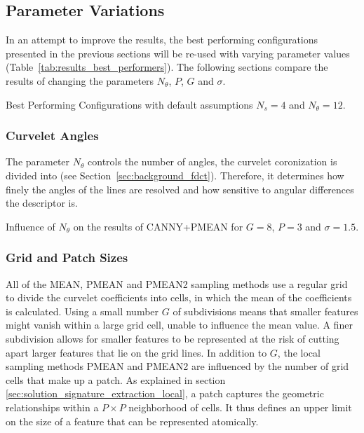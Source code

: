 \subsection{Parameter Variations}

In an attempt to improve the results, the best performing configurations
presented in the previous sections will be re-used with varying parameter
values (Table~\ref{tab:results_best_performers}). The following sections
compare the results of changing the parameters $N_{\theta}$, $P$, $G$ and
$\sigma$.

\begin{table}[h]
    \centering
    \resultsbestperformers
    \caption[Best Performing Configurations]{
        Best Performing Configurations with default assumptions $N_s=4$ and
        $N_{\theta}=12$.
    }
    \label{tab:results_best_performers}
\end{table}

\FloatBarrier
\subsubsection{Curvelet Angles}

The parameter $N_{\theta}$ controls the number of angles, the curvelet
coronization is divided into (see Section~\ref{sec:background_fdct}).
Therefore, it determines how finely the angles of the lines are resolved and
how sensitive to angular differences the descriptor is.

\begin{table}[h]
    \centering
    \resultsparameterangles
    \caption[Angle Parameter Results]{
        Influence of $N_{\theta}$ on the results of CANNY+PMEAN for $G=8$,
        $P=3$ and $\sigma=1.5$.
    }
    \label{tab:results_parameter_angles}
\end{table}

\FloatBarrier
\subsubsection{Grid and Patch Sizes}

All of the MEAN, PMEAN and PMEAN2 sampling methods use a regular grid to divide
the curvelet coefficients into cells, in which the mean of the coefficients is
calculated. Using a small number $G$ of subdivisions means that smaller
features might vanish within a large grid cell, unable to influence the mean
value. A finer subdivision allows for smaller features to be represented at the
risk of cutting apart larger features that lie on the grid lines. In addition
to $G$, the local sampling methods PMEAN and PMEAN2 are influenced by the
number of grid cells that make up a patch. As explained in section
\ref{sec:solution_signature_extraction_local}, a patch captures the geometric
relationships within a $P \times P$ neighborhood of cells. It thus defines an
upper limit on the size of a feature that can be represented atomically.


